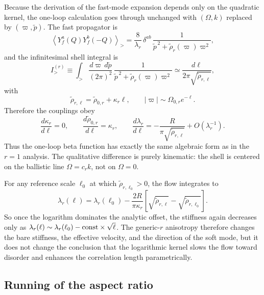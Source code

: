 \documentclass[aps,prx,preprint,amsmath,amssymb]{revtex4-2}
\begin{document}
Because the derivation of the fast-mode expansion depends only on the quadratic
kernel, the one-loop calculation goes through unchanged with
\((\Omega,k)\) replaced by \((\varpi,\tilde p)\).  The fast propagator is
\begin{equation}
\left\langle
Y_f^a(Q)Y_f^b(-Q)
\right\rangle_>
=
\frac{8}{\lambda_r}\,\delta^{ab}\,
\frac{1}{\tilde p^{\,2}+\tilde\rho_r(\varpi)\varpi^2},
\end{equation}
and the infinitesimal shell integral is
\begin{equation}\label{eq:generic-r-shell}
I_>^{(r)}
\equiv
\int_>\frac{d\varpi\,d\tilde p}{(2\pi)^2}\,
\frac{1}{\tilde p^{\,2}+\tilde\rho_r(\varpi)\varpi^2}
\simeq
\frac{d\ell}{2\pi\sqrt{\tilde\rho_{r,\ell}}},
\end{equation}
with
\begin{equation}
\tilde\rho_{r,\ell}
=
\tilde\rho_{0,r}+\kappa_r\ell,
\qquad
|\varpi|\sim \Omega_{0,r}e^{-\ell}.
\end{equation}
Therefore the couplings obey
\begin{equation}\label{eq:generic-r-rg-flows}
\frac{d\kappa_r}{d\ell}=0,
\qquad
\frac{d\tilde\rho_{0,r}}{d\ell}=\kappa_r,
\qquad
\frac{d\lambda_r}{d\ell}
=
-\frac{R}{\pi\sqrt{\tilde\rho_{r,\ell}}}
+O(\lambda_r^{-1}).
\end{equation}
Thus the one-loop beta function has exactly the same algebraic form as in the
\(r=1\) analysis.  The qualitative difference is purely kinematic: the shell is
centered on the ballistic line \(\Omega=c_r k\), not on \(\Omega=0\).

For any reference scale \(\ell_0\) at which \(\tilde\rho_{r,\ell_0}>0\), the
flow integrates to
\begin{equation}\label{eq:generic-r-lambda-integrated}
\lambda_r(\ell)
=
\lambda_r(\ell_0)
-\frac{2R}{\pi\kappa_r}
\left[
\sqrt{\tilde\rho_{r,\ell}}
-\sqrt{\tilde\rho_{r,\ell_0}}
\right].
\end{equation}
So once the logarithm dominates the analytic offset, the stiffness again
decreases only as \(\lambda_r(\ell)\sim\lambda_r(\ell_0)-{\rm const}\times
\sqrt{\ell}\).  The generic-\(r\) anisotropy therefore changes the bare
stiffness, the effective velocity, and the direction of the soft mode, but it
does not change the conclusion that the logarithmic kernel slows the flow
toward disorder and enhances the correlation length parametrically.

\subsection{Running of the aspect ratio}
\end{document}
